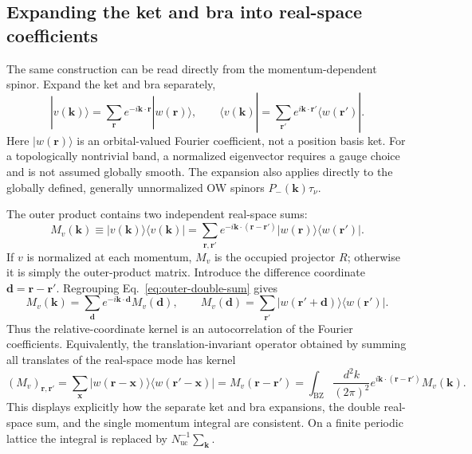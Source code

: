 \documentclass[aps,prb,onecolumn,nofootinbib,superscriptaddress]{revtex4-2}
\newcommand{\bk}{\boldsymbol k}
\newcommand{\br}{\boldsymbol r}
\newcommand{\BZ}{\mathrm{BZ}}
\begin{document}
\subsection{Expanding the ket and bra into real-space coefficients}

The same construction can be read directly from the momentum-dependent spinor. Expand the ket and bra separately,
\begin{equation}
 |v(\bk)\rangle=\sum_{\br}e^{-i\bk\cdot\br}|w(\br)\rangle,\qquad
 \langle v(\bk)|=\sum_{\br'}e^{i\bk\cdot\br'}\langle w(\br')|.
 \label{eq:spinor-expansion}
\end{equation}
Here $|w(\br)\rangle$ is an orbital-valued Fourier coefficient, not a position basis ket. For a topologically nontrivial band, a normalized eigenvector requires a gauge choice and is not assumed globally smooth. The expansion also applies directly to the globally defined, generally unnormalized OW spinors $P_-(\bk)\tau_\nu$.

The outer product contains two independent real-space sums:
\begin{equation}
 M_v(\bk)\equiv|v(\bk)\rangle\langle v(\bk)|
 =\sum_{\br,\br'}e^{-i\bk\cdot(\br-\br')}
 |w(\br)\rangle\langle w(\br')|.
 \label{eq:outer-double-sum}
\end{equation}
If $v$ is normalized at each momentum, $M_v$ is the occupied projector $R$; otherwise it is simply the outer-product matrix. Introduce the difference coordinate $\boldsymbol d=\br-\br'$. Regrouping Eq.~\eqref{eq:outer-double-sum} gives
\begin{equation}
 M_v(\bk)=\sum_{\boldsymbol d}e^{-i\bk\cdot\boldsymbol d}M_v(\boldsymbol d),\qquad
 M_v(\boldsymbol d)=\sum_{\br'}|w(\br'+\boldsymbol d)\rangle\langle w(\br')|.
 \label{eq:autocorrelation}
\end{equation}
Thus the relative-coordinate kernel is an autocorrelation of the Fourier coefficients. Equivalently, the translation-invariant operator obtained by summing all translates of the real-space mode has kernel
\begin{equation}
 (M_v)_{\br,\br'}=\sum_{\boldsymbol x}
 |w(\br-\boldsymbol x)\rangle\langle w(\br'-\boldsymbol x)|
 =M_v(\br-\br')
 =\int_{\BZ}\frac{d^2k}{(2\pi)^2}
 e^{i\bk\cdot(\br-\br')}M_v(\bk).
 \label{eq:translation-sum}
\end{equation}
This displays explicitly how the separate ket and bra expansions, the double real-space sum, and the single momentum integral are consistent. On a finite periodic lattice the integral is replaced by $N_{\mathrm{uc}}^{-1}\sum_{\bk}$.
\end{document}
